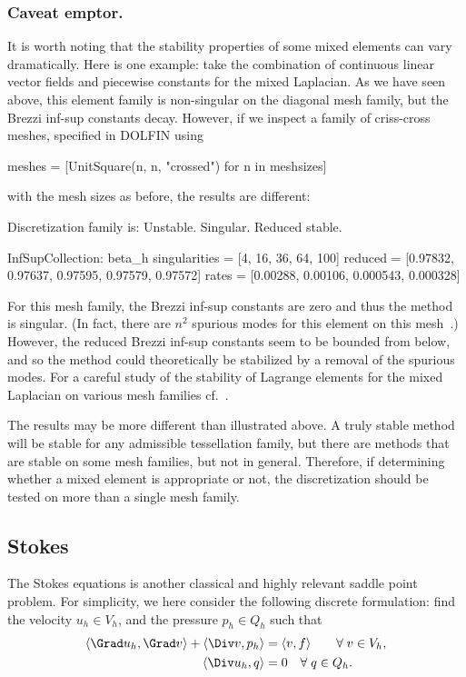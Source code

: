 \subsubsection*{Caveat emptor.}
It is worth noting that the stability properties of some mixed
elements can vary dramatically. Here is one example: take the
combination of continuous linear vector fields and piecewise constants
for the mixed Laplacian. As we have seen above, this element family is
non-singular on the diagonal mesh family, but the Brezzi inf-sup
constants decay. However, if we inspect a family of criss-cross
meshes, specified in DOLFIN using
\begin{python}
meshes = [UnitSquare(n, n, "crossed") for n in meshsizes]
\end{python}
with the mesh sizes as before, the results are different:
\begin{python}
Discretization family is: Unstable. Singular. Reduced stable.

InfSupCollection: beta_h
singularities = [4, 16, 36, 64, 100]
reduced =        [0.97832, 0.97637, 0.97595, 0.97579, 0.97572]
rates  =         [0.00288, 0.00106, 0.000543, 0.000328]
\end{python}
For this mesh family, the Brezzi inf-sup constants are zero and thus
the method is singular. (In fact, there are $n^2$ spurious modes for
this element on this mesh~\cite{Qin1994}.) However, the reduced Brezzi
inf-sup constants seem to be bounded from below, and so the method
could theoretically be stabilized by a removal of the spurious
modes. For a careful study of the stability of Lagrange elements for
the mixed Laplacian on various mesh families
cf.~\cite{ArnoldRognes2009}.

The results may be more different than illustrated above. A truly
stable method will be stable for any admissible tessellation family,
but there are methods that are stable on some mesh families, but not in
general.  Therefore, if determining whether a mixed element is
appropriate or not, the discretization should be tested on more than a
single mesh family.

\subsection{Stokes}

The Stokes equations is another classical and highly relevant saddle
point problem. For simplicity, we here consider the following discrete
formulation: find the velocity $u_h \in V_h$, and the pressure $p_h
\in Q_h$ such that
\begin{equation}
  \label{rognes:eq:stokes}
  \begin{split}
    \langle \Grad u_h, \Grad v \rangle + \langle \Div v, p_h \rangle &=
    \langle v, f \rangle
    \quad\quad \rognesforalls v \in V_h, \\
    \langle \Div u_h, q \rangle &= 0
    \quad \rognesforalls q \in Q_h.
  \end{split}
\end{equation}

